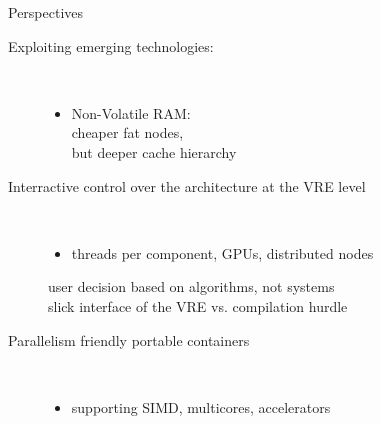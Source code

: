 \documentclass{beamer}
\newcommand{\thus}{\textcolor{red}{\MVRightarrow{}}\xspace}
\begin{document}
\begin{frame} {Perspectives}

  \begin{description}
    \item[Exploiting emerging technologies:]\
      \begin{itemize}
      \item Non-Volatile RAM: \\
        \thus cheaper fat nodes,\\
        \thus but deeper cache hierarchy
      \end{itemize}
  \item[Interractive control over the architecture at the VRE level]\
    \begin{itemize}
    \item threads per component, GPUs, distributed nodes
    \end{itemize}
      \thus user decision based on algorithms, not systems\\
      \thus  slick interface of the VRE  vs. compilation hurdle
      
    \item[Parallelism friendly  portable containers]\
      \begin{itemize}
      \item supporting SIMD, multicores, accelerators
      \end{itemize}

    \item[]

  \end{description}
\end{frame}
\end{document}
